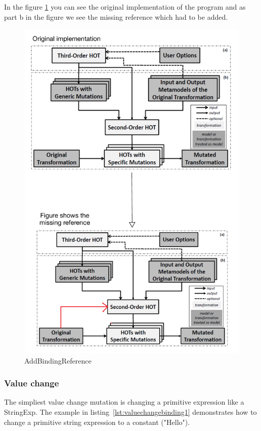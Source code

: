 \documentclass{llncs}
\begin{document}
In the figure \ref{fig:addBindingReference} you can see the original
implementation of the program and as part b in the figure we see the missing
reference which had to be added. 

\begin{figure}
	\centering
	\includegraphics[angle=0,width=1\textwidth,natwidth=610,natheight=642]{figures/AddBindingMissingReference.pdf}
	\caption{AddBindingReference}
	\label{fig:addBindingReference}
\end{figure}


\subsubsection{Value change}

The simpliest value change mutation is changing a primitive expression like a StringExp. The example in listing~\ref{lst:valuechangebinding1} demonstrates how to change a primitive string expression to a constant ("Hello").
\end{document}
